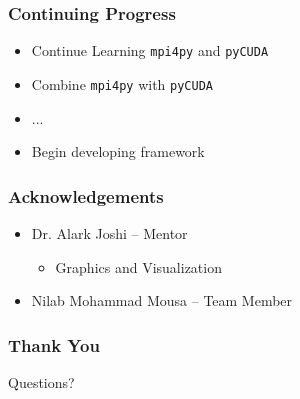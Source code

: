 \documentclass{beamer}
\begin{document}
\begin{frame}
\frametitle{Continuing Progress}
\begin{itemize}
\item{Continue Learning \texttt{mpi4py} and \texttt{pyCUDA}}
\item{Combine \texttt{mpi4py} with \texttt{pyCUDA}}
\item{...}
\item{Begin developing framework}
\end{itemize}
\end{frame}
\begin{frame}
\frametitle{Acknowledgements}
\begin{itemize}
\item{Dr. Alark Joshi -- Mentor}
\begin{itemize}
\item{Graphics and Visualization}
\end{itemize}
\item{Nilab Mohammad Mousa -- Team Member}
\end{itemize}
\end{frame}
\begin{frame}
\frametitle{Thank You}
Questions?
\end{frame}
\end{document}
